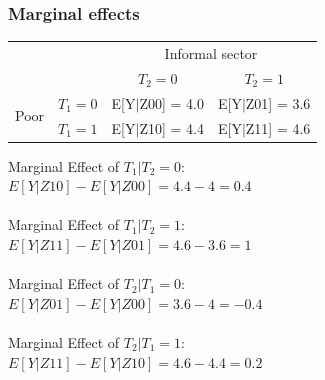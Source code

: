 \documentclass{beamer}\usepackage[]{graphicx}\usepackage[]{color}
\begin{document}
\begin{frame}[t]\frametitle{Marginal effects}
\begin{table}[tb]
	\centering

	\begin{tabular}{ll|cc}
	\hline

	\hline

	&\textbf{} & \multicolumn{2}{c}{Informal sector} \\
	&\textbf{} & \textbf{$T_2=0$} & \textbf{ $T_2=1$} \\
	\hline
\multirow{2}{*}{Poor}	&\textbf{$T_1=0$} & E[Y$|$Z00] = 4.0   & E[Y$|$Z01] = 3.6 \\
	                    &\textbf{$T_1=1$} & E[Y$|$Z10] = 4.4   & E[Y$|$Z11] = 4.6 \\
	\hline

	\hline
	\end{tabular}
\end{table}

\begin{small}
Marginal Effect of $T_1 | T_2 = 0$: \\
$E[Y|Z10] - E[Y|Z00] = 4.4 - 4 = 0.4$ ~\\~\\

Marginal Effect of $T_1|T_2 = 1$: ~\\
$E[Y|Z11] - E[Y|Z01] = 4.6 - 3.6 = 1$~\\~\\

Marginal Effect of $T_2| T_1 = 0:$~\\
$E[Y|Z01] - E[Y|Z00] = 3.6 - 4 = -0.4$~\\~\\

Marginal Effect of $T_2|T_1 = 1$: ~\\
$E[Y|Z11] - E[Y|Z10] = 4.6 - 4.4 = 0.2$~\\~\\	
\end{small}

\end{frame}
\end{document}
